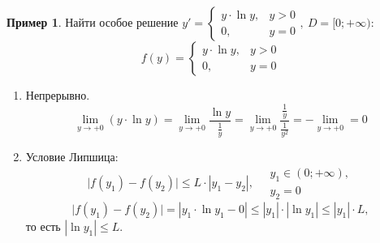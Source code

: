 \documentclass[11pt,a4paper,oneside]{report}
\theoremstyle{definition}
\newtheorem{example}{Пример}
\theoremstyle{plain}
\theoremstyle{remark}
\begin{document}
\begin{example}
    Найти особое решение $y' = \left\{\begin{array}{rl}
            y\cdot\ln y, & y > 0 \\
            0,           & y = 0
        \end{array}\right., \ D = [0;+\infty)$:
    \begin{equation*}
        f(y) = \left\{\begin{array}{rl}
            y\cdot\ln y, & y > 0 \\
            0,           & y = 0
        \end{array}\right.
    \end{equation*}
    \begin{enumerate}
        \item Непрерывно.
              \begin{equation*}
                  \underset{y\rightarrow+0}{\lim}(y\cdot \ln y) = \underset{y\rightarrow+0}{\lim}\frac{\ln y}{\frac{1}{y}} = \underset{y\rightarrow+0}{\lim}\frac{\frac{1}{y}}{\frac{1}{y^2}} = -\underset{y\rightarrow+0}{\lim} = 0
              \end{equation*}
        \item Условие Липшица:
              \begin{equation*}
                  \big|f(y_1) - f(y_2)\big| \leqslant L \cdot |y_1 - y_2|, \quad \begin{array}{l}
                      y_1 \in (0;+\infty), \\
                      y_2 = 0
                  \end{array}
              \end{equation*}
              \begin{equation*}
                  \big|f(y_1) - f(y_2)\big| = |y_1\cdot \ln y_1 - 0| \leqslant |y_1|\cdot|\ln y_1| \leqslant |y_1| \cdot L,
              \end{equation*}
              то есть $|\ln y_1| \leqslant L$.


\end{enumerate}
\end{example}
\end{document}
